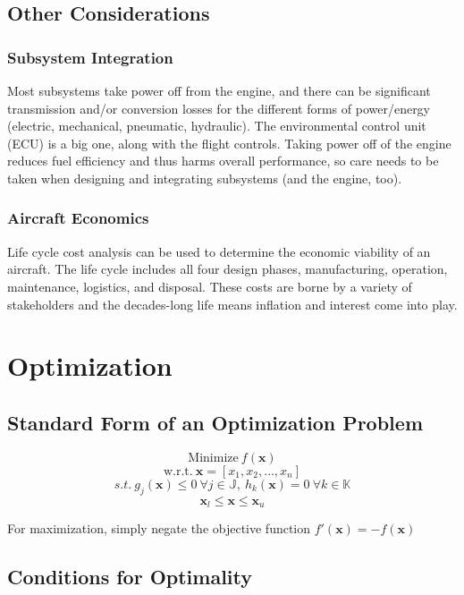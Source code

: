 \documentclass[11pt]{article}
\newcommand{\boldx}{\mathbf{x}}
\begin{document}
\subsection{Other Considerations}
\subsubsection{Subsystem Integration}
Most subsystems take power off from the engine, and there can be significant transmission and/or conversion losses for the different forms of power/energy (electric, mechanical, pneumatic, hydraulic). The environmental control unit (ECU) is a big one, along with the flight controls. Taking power off of the engine reduces fuel efficiency and thus harms overall performance, so care needs to be taken when designing and integrating subsystems (and the engine, too).

\subsubsection{Aircraft Economics}
Life cycle cost analysis can be used to determine the economic viability of an aircraft. The life cycle includes all four design phases, manufacturing, operation, maintenance, logistics, and disposal. These costs are borne by a variety of stakeholders and the decades-long life means inflation and interest come into play.


\section{Optimization}
\subsection{Standard Form of an Optimization Problem}
$$\mathrm{Minimize}\ f(\boldx)$$
$$\mathrm{w.r.t.}\ \boldx=[x_1,x_2,\dots,x_n]$$
$$s.t.\ g_j(\boldx)\leq0\ \forall j\in\mathbb{J},\ h_k(\boldx)=0\ \forall k\in\mathbb{K}$$
$$\boldx_l\leq\boldx\leq\boldx_u$$

For maximization, simply negate the objective function $f'(\boldx)=-f(\boldx)$

\subsection{Conditions for Optimality}
\end{document}
